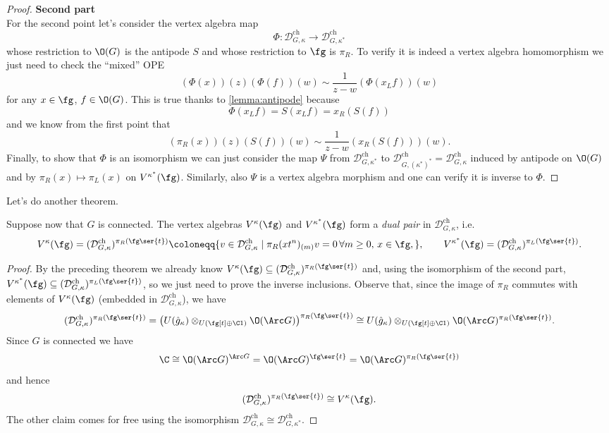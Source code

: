 \documentclass[a4paper, 10pt]{article}
\newcommand{\hg}{ \hat{g}_{\kappa} }                           %
\newcommand{\Dc}{ \mathcal{D}^{\mathrm{ch}}_{G, \kappa} }         %
\newcommand{\Dd}{ \mathcal{D}^{\mathrm{ch}}_{G, \kappa^*} }       %
\begin{document}
\begin{proof}
                \textbf{Second part}\\
                For the second point let's consider the vertex algebra map \[\Phi\colon \Dc \to \Dd \] whose restriction to $\O(G)$ is the antipode $S$ and whose restriction to $\fg$ is $\pi_R$. To verify it is indeed a vertex algebra homomorphism we just need to check the ``mixed'' OPE \[(\Phi(x))(z)(\Phi(f))(w) \sim \frac{1}{z-w}(\Phi(x_Lf))(w) \] for any $x \in \fg$, $f \in \O(G)$. This is true thanks to \cref{lemma:antipode} because \[\Phi(x_Lf) = S(x_Lf) = x_R(S(f)) \] and we know from the first point that \[(\pi_R(x))(z)(S(f))(w) \sim \frac{1}{z-w}( x_R(S(f)) )(w). \]
                Finally, to show that $\Phi$ is an isomorphism we can just consider the map $\Psi$ from $\Dd$ to $\mathcal{D}^{\mathrm{ch}}_{G, (\kappa^*)^*} = \Dc$ induced by antipode on $\O(G)$ and by $\pi_R(x) \mapsto \pi_L(x)$ on $V^{\kappa^*}(\fg)$. Similarly, also $\Psi$ is a vertex algebra morphism and one can verify it is inverse to $\Phi$.
            \end{proof}
        Let's do another theorem.
        \begin{thm}
            Suppose now that $G$ is connected. The vertex algebras $V^{\kappa}(\fg)$ and $V^{\kappa^*}(\fg)$ form a \emph{dual pair} in $\Dc$, i.e.\ \[V^{\kappa}(\fg) = (\Dc)^{\pi_R(\fg\ser{t})} \coloneqq \{v \in \Dc \mid \pi_R(xt^n)_{(m)}v = 0 \, \forall m \geq 0,\, x \in \fg, \},\qquad V^{\kappa^*}(\fg) = (\Dc)^{\pi_L(\fg\ser{t})}. \]
        \end{thm}
        \begin{proof}
            By the preceding theorem we already know $V^{\kappa}(\fg) \subseteq (\Dc)^{\pi_R(\fg\ser{t})}$ and, using the isomorphism of the second part, $V^{\kappa^*}(\fg) \subseteq (\Dc)^{\pi_L(\fg\ser{t})}$, so we just need to prove the inverse inclusions. Observe that, since the image of $\pi_R$ commutes with elements of $V^{\kappa}(\fg)$ (embedded in $\Dc$), we have 
            \begin{gather*}
                (\Dc)^{\pi_R(\fg\ser{t})} = \left(U(\hg) \otimes_{U(\fg[t] \oplus \C 1)} \O(\Arc G)\right)^{\pi_R(\fg\ser{t})} \cong U(\hg) \otimes_{U(\fg[t] \oplus \C 1)} \O(\Arc G)^{\pi_R(\fg\ser{t})}.
            \end{gather*}
            Since $G$ is connected we have \[\C \cong \O(\Arc G)^{\Arc G} = \O(\Arc G)^{\fg\ser{t}} = \O(\Arc G)^{\pi_R(\fg\ser{t})} \] and hence \[(\Dc)^{\pi_R(\fg\ser{t})} \cong V^{\kappa}(\fg). \] The other claim comes for free using the isomorphism $\Dc \cong \Dd$.
        \end{proof}
\end{document}
